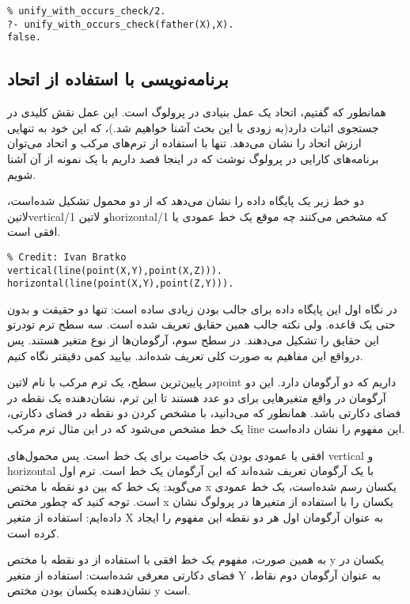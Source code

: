 \begin{latin}
\begin{lstlisting}
% unify_with_occurs_check/2.
?- unify_with_occurs_check(father(X),X).
false.
\end{lstlisting}
\end{latin}

\subsection{برنامه‌نویسی با استفاده از اتحاد}
همانطور که گفتیم، اتحاد یک عمل بنیادی در پرولوگ است. این عمل نقش کلیدی در جستجوی اثبات دارد(به زودی با این بحث آشنا خواهیم شد.)، که این خود به تنهایی ارزش اتحاد را نشان می‌دهد. تنها با استفاده از ترم‌های مرکب و اتحاد می‌توان برنامه‌های کارایی در پرولوگ نوشت که در اینجا قصد داریم با یک نمونه از آن آشنا شویم.

دو خط زیر یک پایگاه داده را نشان می‌دهد که از دو محمول تشکیل شده‌است، ‌لاتین{vertical/1} و ‌لاتین{horizontal/1} که مشخص می‌کنند چه موقع یک خط عمودی یا افقی است.

\begin{latin}
\begin{lstlisting}
% Credit: Ivan Bratko
vertical(line(point(X,Y),point(X,Z))). 
horizontal(line(point(X,Y),point(Z,Y))).
\end{lstlisting}
\end{latin}

در نگاه اول این پایگاه داده برای جالب بودن زیادی ساده است: تنها دو حقیقت و بدون حتی یک قاعده. ولی نکته جالب همین حقایق تعریف شده است. سه سطح ترم تودرتو این حقایق را تشکیل می‌دهند. در سطح سوم، آرگومان‌ها از نوع متغیر هستند. پس درواقع این مفاهیم به صورت کلی تعریف شده‌اند. بیایید کمی دقیقتر نگاه کنیم.

در پایین‌ترین سطح، یک ترم مرکب با نام ‌لاتین{point} داریم که دو آرگومان دارد.  این دو آرگومان در واقع متغیرهایی برای دو عدد هستند تا این ترم، نشان‌دهنده یک نقطه در فضای دکارتی باشد. همانطور که می‌دانید، با مشخص کردن دو نقطه در فضای دکارتی، یک خط مشخص می‌شود که در این مثال ترم مرکب line این مفهوم را نشان داده‌است.

افقی یا عمودی بودن یک خاصیت برای یک خط است. پس محمول‌های vertical و horizontal با یک آرگومان تعریف شده‌اند که این آرگومان یک خط است. ترم اول می‌گوید: یک خط که بین دو نقطه با مختص x یکسان رسم شده‌است، یک خط عمودی است. توجه کنید که چطور مختص x یکسان را با استفاده از متغیرها در پرولوگ نشان داده‌ایم: استفاده از متغیر X به عنوان آرگومان اول هر دو نقطه این مفهوم را ایجاد کرده است.

به همین صورت، مفهوم یک خط افقی با استفاده از دو نقطه با مختص y‌ یکسان در فضای دکارتی معرفی شده‌است: استفاده از متغیر Y به عنوان آرگومان دوم نقاط، نشان‌دهنده یکسان بودن مختص y است.

